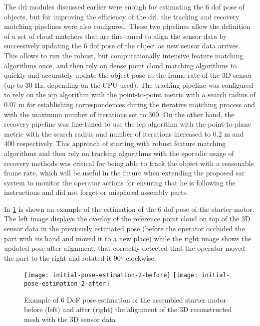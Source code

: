 The drl modules discussed earlier were enough for estimating the 6 \gls{dof} pose of objects, but for improving the efficiency of the drl, the tracking and recovery matching pipelines were also configured. These two pipelines allow the definition of a set of cloud matchers that are fine-tuned to align the sensor data by successively updating the 6 \gls{dof} pose of the object as new sensor data arrives. This allows to run the robust, but computationally intensive feature matching algorithms once, and then rely on dense point cloud matching algorithms to quickly and accurately update the object pose at the frame rate of the 3D sensor (up to 30 Hz, depending on the CPU used). The tracking pipeline was configured to rely on the \gls{icp} algorithm with the point-to-point metric with a search radius of 0.07 m for establishing correspondences during the iterative matching process and with the maximum number of iterations set to 300. On the other hand, the recovery pipeline was fine-tuned to use the \gls{icp} algorithm with the point-to-plane metric with the search radius and number of iterations increased to 0.2 m and 400 respectively. This approach of starting with robust feature matching algorithms and then rely on tracking algorithms with the sporadic usage of recovery methods was critical for being able to track the object with a reasonable frame rate, which will be useful in the future when extending the proposed \gls{sar} system to monitor the operator actions for ensuring that he is following the instructions and did not forget or misplaced assembly parts.

In \cref{fig:initial-pose-estimation} is shown an example of the estimation of the 6 \gls{dof} pose of the starter motor. The left image displays the overlay of the reference point cloud on top of the 3D sensor data in the previously estimated pose (before the operator occluded the part with its hand and moved it to a new place) while the right image shows the updated pose after alignment, that correctly detected that the operator moved the part to the right and rotated it 90º clockwise.

\vspace{-0.5em}
\begin{figure}[!ht]
	\centering
	\texttt{[image: initial-pose-estimation-2-before]}
	\texttt{[image: initial-pose-estimation-2-after]}
	\caption{Example of 6 DoF pose estimation of the assembled starter motor before (left) and after (right) the alignment of the 3D reconstructed mesh with the 3D sensor data}
	\label{fig:initial-pose-estimation}
	\vspace{-0.5em}
\end{figure}
\vspace{-1.5em}
